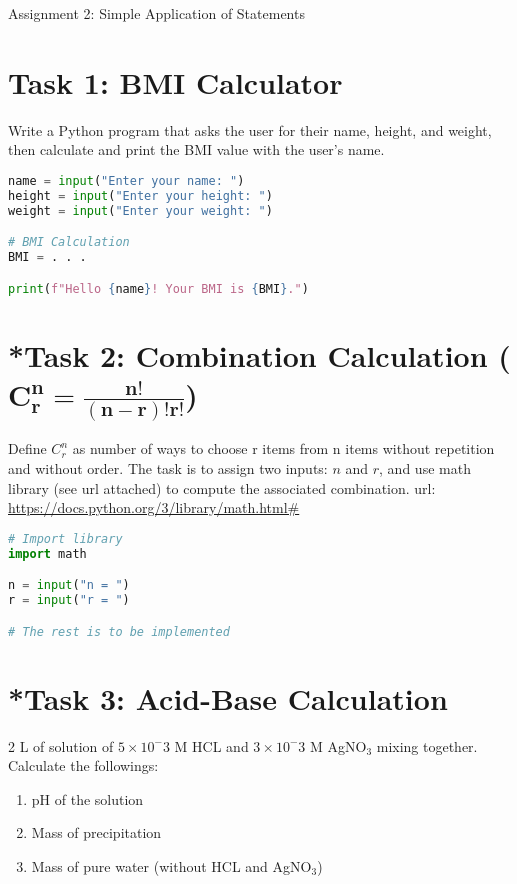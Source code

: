 \documentclass[11pt]{article}
\begin{document}
\begin{center}
    \Large{Assignment 2: Simple Application of Statements}
\end{center}

\section*{Task 1: BMI Calculator}
Write a Python program that asks the user for their name, height, and weight, then calculate and print the BMI value with the user's name.

\begin{lstlisting}[language=Python]
name = input("Enter your name: ")
height = input("Enter your height: ")
weight = input("Enter your weight: ")

# BMI Calculation
BMI = . . .

print(f"Hello {name}! Your BMI is {BMI}.")
\end{lstlisting}

\section*{*Task 2: Combination Calculation (\(\mathbf{C_r^n = \frac{n!}{(n-r)!r!}}\))}
Define \(C_r^n\) as number of ways to choose r items from n items without repetition and without order.
The task is to assign two inputs: \(n\) and \(r\), and use math library (see url attached) to compute the associated combination.
url: \url{https://docs.python.org/3/library/math.html#}

\begin{lstlisting}[language=Python]
# Import library 
import math

n = input("n = ")
r = input("r = ")

# The rest is to be implemented
\end{lstlisting}


\begin{tcolorbox}[colback=black!10!white, colframe=black!75!white, title=\textbf{Answer}]
    \vspace{5cm}
\end{tcolorbox}

\section*{*Task 3: Acid-Base Calculation}
2 L of solution of \(5 \times 10^-3\) M HCL and \(3 \times 10^-3\) M AgNO\(_3\) mixing together. Calculate the followings:
\begin{enumerate}
    \item pH of the solution
    \item Mass of precipitation
    \item Mass of pure water (without HCL and AgNO\(_3\)) 
\end{enumerate}
\end{document}
